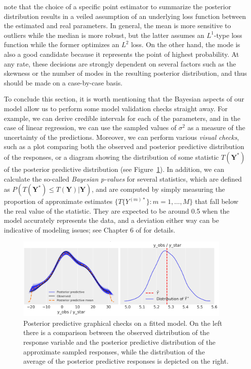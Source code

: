 \documentclass[ba]{imsart}
\numberwithin{equation}{section}
\theoremstyle{plain}
\begin{document}
 note that the choice of a specific point estimator to summarize the posterior distribution results in a veiled assumption of an underlying loss function between the estimated and real parameters. In general, the mean is more sensitive to outliers while the median is more robust, but the latter assumes an \(L^1\)-type loss function while the former optimizes an \(L^2\) loss. On the other hand, the mode is also a good candidate because it represents the point of highest probability. At any rate, these decisions are strongly dependent on several factors such as the skewness or the number of modes in the resulting posterior distribution, and thus should be made on a case-by-case basis.

To conclude this section, it is worth mentioning that the Bayesian aspects of our model allow us to perform some model validation checks straight away. For example, we can derive credible intervals for each of the parameters, and in the case of linear regression, we can use the sampled values of \(\sigma^2\) as a measure of the uncertainty of the predictions. Moreover, we can perform various \textit{visual checks}, such as a plot comparing both the observed and posterior predictive distribution of the responses, or a diagram showing the distribution of some statistic \(T(\bm Y^*)\) of the posterior predictive distribution (see Figure~\ref{fig:ppc}). In addition, we can calculate the so-called \textit{Bayesian p-values} for several statistics, which are defined as \(P(T(\bm Y^*)\leq T(\bm Y)| \bm Y)\), and are computed by simply measuring the proportion of approximate estimates \(\{T\{Y^{(m)*}\}: m=1,\dots,M\}\) that fall below the real value of the statistic. They are expected to be around 0.5 when the model accurately represents the data, and a deviation either way can be indicative of modeling issues; see Chapter 6 of \citet{gelman1995bayesian} for details.

\begin{figure}[h]
  \centering
  \includegraphics[width=0.95\textwidth]{img/ppc_lin}
  \caption{Posterior predictive graphical checks on a fitted model. On the left there is a comparison between the observed distribution of the response variable and the posterior predictive distribution of the approximate sampled responses, while the distribution of the average of the posterior predictive responses is depicted on the right.}\label{fig:ppc}
\end{figure}
\end{document}
